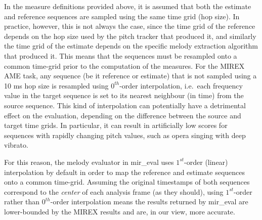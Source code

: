 \documentclass{article}
\begin{document}
In the measure definitions provided above, it is assumed that both the estimate
and reference sequences are sampled using the same time grid (hop size). In
practice, however, this is not always the case, since the time grid of the
reference depends on the hop size used by the pitch tracker that produced
it, and similarly the time grid of the estimate depends on the specific melody
extraction algorithm that produced it. This means that the sequences must be
resampled onto a common time-grid prior to the computation of the measures. For
the MIREX AME task, any sequence (be it reference or estimate) that is not
sampled using a 10 ms hop size is resampled using $0^{th}$-order interpolation,
i.e.~each frequency value in the target sequence is set to its nearest
neighbour (in time) from the source sequence. This kind of interpolation can
potentially have a detrimental effect on the evaluation, depending on the
difference between the source and target time grids. In particular, it can
result in artificially low scores for sequences with rapidly changing pitch
values, such as opera singing with deep vibrato. 

For this reason, the melody evaluator in mir\_eval uses $1^{st}$-order (linear)
interpolation by default in order to map the reference and estimate sequences
onto a common time-grid. Assuming the original timestamps of both sequences
correspond to the \textit{center} of each analysis frame (as they should),
using $1^{st}$-order rather than $0^{th}$-order interpolation means the results
returned by mir\_eval are lower-bounded by the MIREX results and are, in our
view, more accurate.



% 
\end{document}
